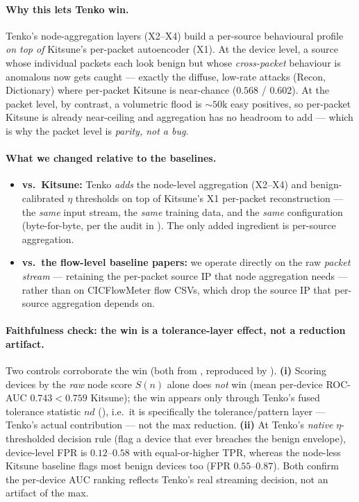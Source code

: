\documentclass[11pt]{article}
\begin{document}
\paragraph{Why this lets Tenko win.} Tenko's node-aggregation layers (X2--X4) build a per-source
behavioural profile \emph{on top of} Kitsune's per-packet autoencoder (X1). At the device level, a
source whose individual packets each look benign but whose \emph{cross-packet} behaviour is
anomalous now gets caught --- exactly the diffuse, low-rate attacks (Recon, Dictionary) where
per-packet Kitsune is near-chance ($0.568$ / $0.602$). At the packet level, by contrast, a
volumetric flood is $\sim$$50$k easy positives, so per-packet Kitsune is already near-ceiling and
aggregation has no headroom to add --- which is why the packet level is \emph{parity, not a bug}.

\paragraph{What we changed relative to the baselines.}
\begin{itemize}
  \item \textbf{vs.\ Kitsune:} Tenko \emph{adds} the node-level aggregation (X2--X4) and
        benign-calibrated $\eta$ thresholds on top of Kitsune's X1 per-packet reconstruction --- the
        \emph{same} input stream, the \emph{same} training data, and the \emph{same} configuration
        (byte-for-byte, per the audit in ). The only added ingredient
        is per-source aggregation.
  \item \textbf{vs.\ the flow-level baseline papers:} we operate directly on the raw \emph{packet
        stream} --- retaining the per-packet source IP that node aggregation needs --- rather than
        on CICFlowMeter flow CSVs, which drop the source IP that per-source aggregation depends on.
\end{itemize}

\paragraph{Faithfulness check: the win is a tolerance-layer effect, not a reduction artifact.} Two
controls corroborate the win (both from , reproduced by
). \textbf{(i)} Scoring devices by the \emph{raw} node score $S(n)$
alone does \emph{not} win (mean per-device ROC-AUC $0.743 < 0.759$ Kitsune); the win appears only
through Tenko's fused tolerance statistic $nd$ (), i.e.\ it is specifically the
tolerance/pattern layer --- Tenko's actual contribution --- not the max reduction. \textbf{(ii)} At
Tenko's \emph{native} $\eta$-thresholded decision rule (flag a device that ever breaches the benign
envelope), device-level FPR is $0.12$--$0.58$ with equal-or-higher TPR, whereas the node-less
Kitsune baseline flags most benign devices too (FPR $0.55$--$0.87$). Both confirm the per-device
AUC ranking reflects Tenko's real streaming decision, not an artifact of the max.
\end{document}
